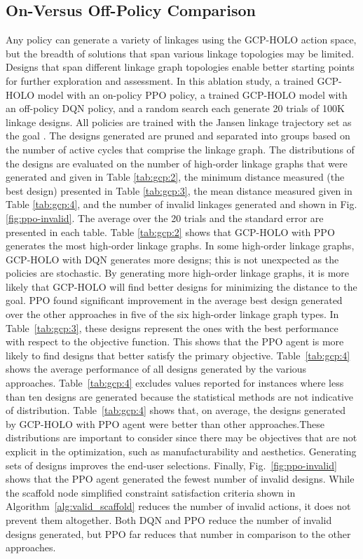 \subsection{On-Versus Off-Policy Comparison}\label{sec:gcp:results:policy}
Any policy can generate a variety of linkages using the GCP-HOLO action space, but the breadth of solutions that span various linkage topologies may be limited. Designs that span different linkage graph topologies enable better starting points for further exploration and assessment. In this ablation study, a trained GCP-HOLO model with an on-policy PPO policy, a trained GCP-HOLO model with an off-policy DQN policy, and a random search each generate 20 trials of 100K linkage designs. All policies are trained with the Jansen linkage trajectory set as the goal \cite{Jansen1990Strandbeast}. The designs generated are pruned and separated into groups based on the number of active cycles that comprise the linkage graph. The distributions of the designs are evaluated on the number of high-order linkage graphs that were generated and given in Table \ref{tab:gcp:2}, the minimum distance measured (the best design) presented in Table \ref{tab:gcp:3}, the mean distance measured given in Table \ref{tab:gcp:4}, and the number of invalid linkages generated and shown in Fig. \ref{fig:ppo-invalid}. The average over the 20 trials and the standard error are presented in each table. Table \ref{tab:gcp:2} shows that GCP-HOLO with PPO generates the most high-order linkage graphs. In some high-order linkage graphs, GCP-HOLO with DQN generates more designs; this is not unexpected as the policies are stochastic. By generating more high-order linkage graphs, it is more likely that GCP-HOLO will find better designs for minimizing the distance to the goal. PPO found significant improvement in the average best design generated over the other approaches in five of the six high-order linkage graph types. In Table~\ref{tab:gcp:3}, these designs represent the ones with the best performance with respect to the objective function. This shows that the PPO agent is more likely to find designs that better satisfy the primary objective. Table~\ref{tab:gcp:4} shows the average performance of all designs generated by the various approaches. Table~\ref{tab:gcp:4} excludes values reported for instances where less than ten designs are generated because the statistical methods are not indicative of distribution. Table~\ref{tab:gcp:4} shows that, on average, the designs generated by GCP-HOLO with PPO agent were better than other approaches.These distributions are important to consider since there may be objectives that are not explicit in the optimization, such as manufacturability and aesthetics. Generating sets of designs improves the end-user selections. Finally, Fig.~\ref{fig:ppo-invalid} shows that the PPO agent generated the fewest number of invalid designs. While the scaffold node simplified constraint satisfaction criteria shown in Algorithm~\ref{alg:valid_scaffold} reduces the number of invalid actions, it does not prevent them altogether. Both DQN and PPO reduce the number of invalid designs generated, but PPO far reduces that number in comparison to the other approaches. 

